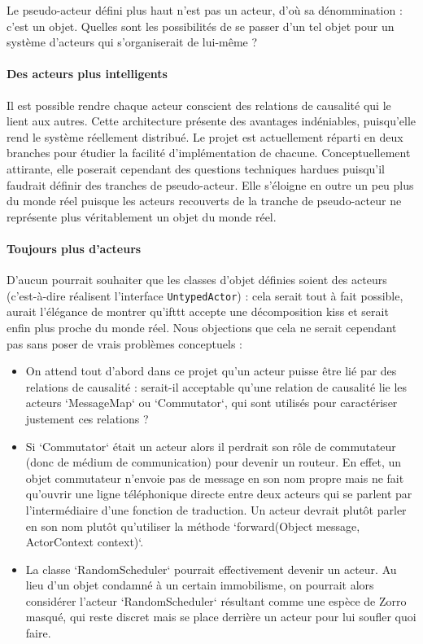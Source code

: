 \documentclass[11pt]{article}
\begin{document}
Le pseudo-acteur défini plus haut n'est pas un acteur, d'où sa dénommination : c'est un objet. Quelles sont les possibilités de se passer d'un tel objet pour un système d'acteurs qui s'organiserait de lui-même ?

\paragraph{Des acteurs plus intelligents} Il est possible rendre chaque acteur conscient des relations de causalité qui le lient aux autres. Cette architecture présente des avantages indéniables, puisqu'elle rend le système réellement distribué. Le projet est actuellement réparti en deux branches pour étudier la facilité d'implémentation de chacune. Conceptuellement attirante, elle poserait cependant des questions techniques hardues puisqu'il faudrait définir des \og tranches \fg{} de pseudo-acteur. Elle s'éloigne en outre un peu plus du monde réel puisque les acteurs recouverts de la tranche de pseudo-acteur ne représente plus véritablement un objet du monde réel.

\paragraph{Toujours plus d'acteurs} D'aucun pourrait souhaiter que les classes d'objet définies soient des acteurs (c'est-à-dire réalisent l'interface \texttt{UntypedActor}) : cela serait tout à fait possible, aurait l'élégance de montrer qu'ifttt accepte une décomposition kiss et serait enfin plus proche du monde réel. Nous objections que cela ne serait cependant pas sans poser de vrais problèmes conceptuels :
\begin{itemize}
\item On attend tout d'abord dans ce projet qu'un acteur puisse être lié par des relations de causalité : serait-il acceptable qu'une relation de causalité lie les acteurs `MessageMap` ou `Commutator`, qui sont utilisés pour caractériser justement ces relations ?
\item Si `Commutator` était un acteur alors il perdrait son rôle de commutateur (donc de médium de communication) pour devenir un routeur. En effet, un objet commutateur n'envoie pas de message en son nom propre mais ne fait qu'ouvrir une ligne téléphonique directe entre deux acteurs qui se parlent par l'intermédiaire d'une fonction de traduction. Un acteur devrait plutôt parler en son nom plutôt qu'utiliser la méthode `forward(Object message, ActorContext context)`.
\item La classe `RandomScheduler` pourrait effectivement devenir un acteur. Au lieu d'un objet condamné à un certain immobilisme, on pourrait alors considérer l'acteur `RandomScheduler` résultant comme une espèce de Zorro masqué, qui reste discret mais se place derrière un acteur pour lui soufler quoi faire.
\end{itemize}
\end{document}
